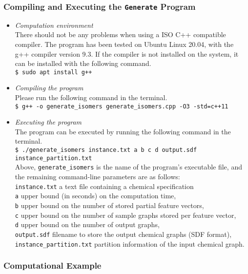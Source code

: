 \documentclass[11pt,titlepage,dvipdfmx,twoside]{article}
\begin{document}
\subsubsection{Compiling and Executing the {\tt Generate} Program}
\label{sec:compile_m}
\begin{itemize}
	\item {\em Computation environment}\\
		There should not be any problems when using a ISO C++ compatible compiler. %
		The program has been tested on 
		Ubuntu Linux 20.04,  with the  g++ compiler version 9.3.
		If the compiler is not installed on the system, it can be installed with
		the following command.\\
		\verb|$ sudo apt install g++|
	\item {\em Compiling the program}\\
		Please run the following command in the terminal.\\
		\verb|$ g++ -o generate_isomers generate_isomers.cpp -O3 -std=c++11|\\
	\item {\em Executing the program}\\
		The program can be executed by running the following command in the terminal.\\
		\verb|$ ./generate_isomers instance.txt a b c d output.sdf instance_partition.txt|\\
		Above, {\tt generate\_isomers} is the name of the program's executable file, and the remaining command-line
		parameters are as follows: \\
		\verb|instance.txt|  a text file containing a chemical specification \\
		\verb|a| upper bound (in seconds) on the computation time, \\
		\verb|b| upper bound on the number of stored partial feature vectors, \\
		\verb|c| upper bound on the number of sample graphs stored per feature vector, \\
		\verb|d| upper bound on the number of output graphs, \\
		\verb|output.sdf| filename to store the output chemical graphs (SDF format), \\
		\verb|instance_partition.txt|  partition information of the input chemical graph.
\end{itemize}


\subsubsection{Computational Example}
\label{sec:instance_p}
\end{document}
